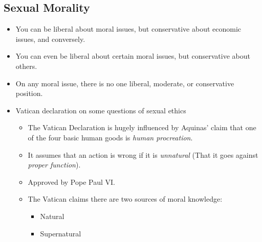 \documentclass{article}
\begin{document}
\begin{spacing}{1.2}
    \section{Sexual Morality}
    \begin{itemize}
        \item You can be liberal about moral issues, but conservative about economic issues, and conversely.
        \item You can even be liberal about certain moral issues, but conservative about others.
        \item On any moral issue, there is no one liberal, moderate, or conservative position.
        \item Vatican declaration on some questions of sexual ethics
              \begin{itemize}
                  \item The Vatican Declaration is hugely influenced by Aquinas' claim that one of the four basic human goods is \emph{human procreation}.
                  \item It assumes that an action is wrong if it is \emph{unnatural} (That it goes against \emph{proper function}).
                  \item Approved by Pope Paul VI.\@
                  \item The Vatican claims there are two sources of moral knowledge:
                        \begin{itemize}
                            \item Natural
                            \item Supernatural
                        \end{itemize}

              \end{itemize}
    \end{itemize}
\end{spacing}
\end{document}
